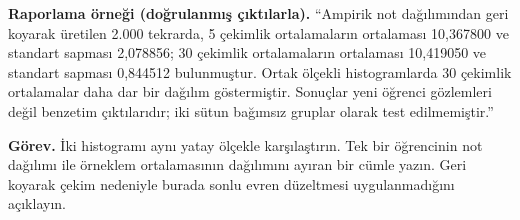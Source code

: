 \textbf{Raporlama örneği (doğrulanmış çıktılarla).}
``Ampirik not dağılımından geri koyarak üretilen 2.000 tekrarda,
5 çekimlik ortalamaların ortalaması 10,367800 ve standart sapması
2,078856; 30 çekimlik ortalamaların ortalaması 10,419050 ve standart
sapması 0,844512 bulunmuştur. Ortak ölçekli histogramlarda 30 çekimlik
ortalamalar daha dar bir dağılım göstermiştir. Sonuçlar yeni öğrenci
gözlemleri değil benzetim çıktılarıdır; iki sütun bağımsız gruplar
olarak test edilmemiştir.''


\textbf{Görev.} İki histogramı aynı yatay ölçekle karşılaştırın. Tek bir
öğrencinin not dağılımı ile örneklem ortalamasının dağılımını ayıran bir
cümle yazın. Geri koyarak çekim nedeniyle burada sonlu evren düzeltmesi
uygulanmadığını açıklayın.